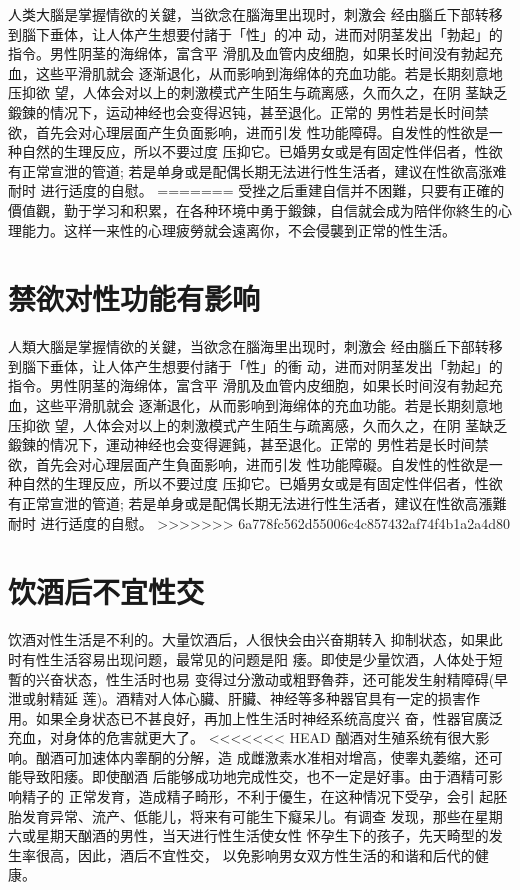 \documentclass[12pt,UTF8]{ctexbook}
\begin{document}
人类大腦是掌握情欲的关鍵，当欲念在腦海里出现时，刺激会
经由腦丘下部转移到腦下垂体，让人体产生想要付諸于「性」的冲
动，进而对阴茎发出「勃起」的指令。男性阴茎的海绵体，富含平
滑肌及血管内皮细胞，如果长时间没有勃起充血，这些平滑肌就会
逐渐退化，从而影响到海绵体的充血功能。若是长期刻意地压抑欲
望，人体会对以上的刺激模式产生陌生与疏离感，久而久之，在阴
茎缺乏鍛鍊的情况下，运动神经也会变得迟钝，甚至退化。正常的
男性若是长时间禁欲，首先会对心理层面产生负面影响，进而引发
性功能障碍。自发性的性欲是一种自然的生理反应，所以不要过度
压抑它。已婚男女或是有固定性伴侣者，性欲有正常宣泄的管道;
若是单身或是配偶长期无法进行性生活者，建议在性欲高涨难耐时
进行适度的自慰。
=======
受挫之后重建自信并不困難，只要有正確的價值觀，勤于学习和积累，在各种环境中勇于鍛鍊，自信就会成为陪伴你終生的心理能力。这样一来性的心理疲勞就会遠离你，不会侵襲到正常的性生活。

\section{禁欲对性功能有影响}

人類大腦是掌握情欲的关鍵，当欲念在腦海里出现时，刺激会
经由腦丘下部转移到腦下垂体，让人体产生想要付諸于「性」的衝
动，进而对阴茎发出「勃起」的指令。男性阴茎的海绵体，富含平
滑肌及血管内皮细胞，如果长时间沒有勃起充血，这些平滑肌就会
逐漸退化，从而影响到海绵体的充血功能。若是长期刻意地压抑欲
望，人体会对以上的刺激模式产生陌生与疏离感，久而久之，在阴
茎缺乏鍛鍊的情况下，運动神经也会变得遲鈍，甚至退化。正常的
男性若是长时间禁欲，首先会对心理层面产生負面影响，进而引发
性功能障礙。自发性的性欲是一种自然的生理反应，所以不要过度
压抑它。已婚男女或是有固定性伴侣者，性欲有正常宣泄的管道;
若是单身或是配偶长期无法进行性生活者，建议在性欲高漲難耐时
进行适度的自慰。
>>>>>>> 6a778fc562d55006c4c857432af74f4b1a2a4d80

\section{饮酒后不宜性交}

饮酒对性生活是不利的。大量饮酒后，人很快会由兴奋期转入
抑制状态，如果此时有性生活容易出现问题，最常见的问题是阳
痿。即使是少量饮酒，人体处于短暫的兴奋状态，性生活时也易
变得过分激动或粗野魯莽，还可能发生射精障碍(早泄或射精延
莲)。酒精对人体心臟、肝臟、神经等多种器官具有一定的损害作
用。如果全身状态已不甚良好，再加上性生活时神经系统高度兴
奋，性器官廣泛充血，对身体的危害就更大了。
<<<<<<< HEAD
酗酒对生殖系统有很大影响。酗酒可加速体内睾酮的分解，造
成雌激素水准相对增高，使睾丸萎缩，还可能导致阳痿。即使酗酒
后能够成功地完成性交，也不一定是好事。由于酒精可影响精子的
正常发育，造成精子畸形，不利于優生，在这种情况下受孕，会引
起胚胎发育异常、流产、低能儿，将来有可能生下癡呆儿。有调查
发现，那些在星期六或星期天酗酒的男性，当天进行性生活使女性
怀孕生下的孩子，先天畸型的发生率很高，因此，酒后不宜性交，
以免影响男女双方性生活的和谐和后代的健康。
\end{document}
